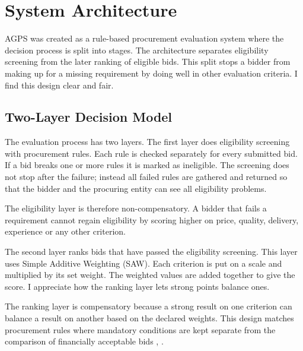 \documentclass[conference]{IEEEtran}
\begin{document}
%

\section{System Architecture}
\label{sec:arch}

AGPS was created as a rule-based procurement evaluation system where the
decision process is split into stages. The architecture separates
eligibility screening from the later ranking of eligible bids. This split
stops a bidder from making up for a missing requirement by doing well in
other evaluation criteria. I find this design clear and fair.

\subsection{Two-Layer Decision Model}
\label{subsec:two-layer}

The evaluation process has two layers. The first layer does eligibility
screening with procurement rules. Each rule is checked separately for
every submitted bid. If a bid breaks one or more rules it is marked as
ineligible. The screening does not stop after the failure; instead all
failed rules are gathered and returned so that the bidder and the
procuring entity can see all eligibility problems.

The eligibility layer is therefore non-compensatory. A bidder that fails
a requirement cannot regain eligibility by scoring higher on price,
quality, delivery, experience or any other criterion.

The second layer ranks bids that have passed the eligibility screening.
This layer uses Simple Additive Weighting (SAW). Each criterion is put on
a scale and multiplied by its set weight. The weighted values are added
together to give the score. I appreciate how the ranking layer lets
strong points balance ones.

The ranking layer is compensatory because a strong result on one
criterion can balance a result on another based on the declared weights.
This design matches procurement rules where mandatory conditions are kept
separate from the comparison of financially acceptable bids
\cite{ref1}, \cite{ref2}.
\end{document}
